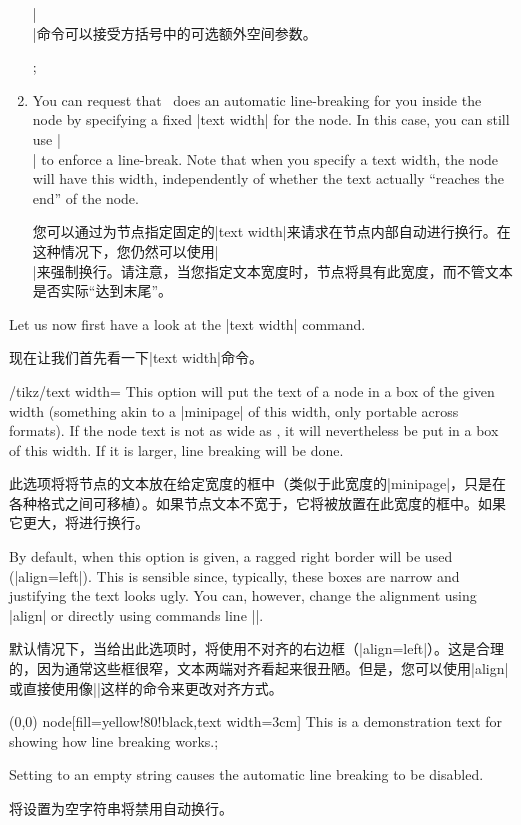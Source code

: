 \begin{enumerate}
        |\\|命令可以接受方括号中的可选额外空间参数。        
\begin{codeexample}[]
\tikz {};
\end{codeexample}
    \item You can request that \tikzname\ does an automatic line-breaking for
        you inside the node by specifying a fixed |text width| for the node. In
        this case, you can still use |\\| to enforce a line-break. Note that
        when you specify a text width, the node will have this width,
        independently of whether the text actually ``reaches the end'' of the
        node.

        您可以通过为节点指定固定的|text width|来请求\tikzname 在节点内部自动进行换行。在这种情况下，您仍然可以使用|\\|来强制换行。请注意，当您指定文本宽度时，节点将具有此宽度，而不管文本是否实际“达到末尾”。
\end{enumerate}

Let us now first have a look at the |text width| command.
    
现在让我们首先看一下|text width|命令。


\begin{key}{/tikz/text width=}
    This option will put the text of a node in a box of the given width
    (something akin to a |{minipage}| of this width, only portable across
    formats). If the node text is not as wide as , it will
    nevertheless be put in a box of this width. If it is larger, line breaking
    will be done.
    
    此选项将将节点的文本放在给定宽度的框中（类似于此宽度的|{minipage}|，只是在各种格式之间可移植）。如果节点文本不宽于，它将被放置在此宽度的框中。如果它更大，将进行换行。

    By default, when this option is given, a ragged right border will be used
    (|align=left|). This is sensible since, typically, these boxes are narrow
    and justifying the text looks ugly. You can, however, change the alignment
    using |align| or directly using commands line |\centering|.
    
    默认情况下，当给出此选项时，将使用不对齐的右边框（|align=left|）。这是合理的，因为通常这些框很窄，文本两端对齐看起来很丑陋。但是，您可以使用|align|或直接使用像|\centering|这样的命令来更改对齐方式。


\begin{codeexample}[]
\tikz \draw (0,0) node[fill=yellow!80!black,text width=3cm]
  {This is a demonstration text for showing how line breaking works.};
\end{codeexample}
    Setting  to an empty string causes the automatic line
    breaking to be disabled.

    将设置为空字符串将禁用自动换行。
\end{key}

